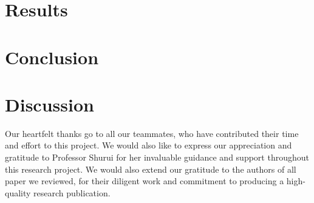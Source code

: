 \documentclass[acmtog]{acmart}
\begin{document}
\section{Results}
\label{results}



\section{Conclusion}
\label{conclusion}


\section{Discussion}
\label{discussion}


\begin{acks}
Our heartfelt thanks go to all our teammates, who have contributed their time and effort to this project. 
We would also like to express our appreciation and gratitude to Professor Shurui for her invaluable guidance and support throughout this research project. 
We would also extend our gratitude to the authors of all paper we reviewed, for their diligent work and commitment to producing a high-quality research publication.
\end{acks}





\end{document}
